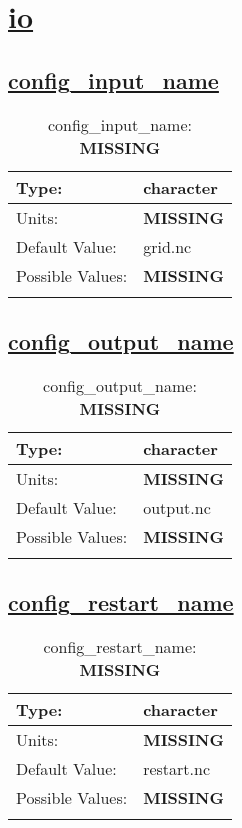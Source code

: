 \section[io]{\hyperref[sec:nm_tab_io]{io}}
\label{sec:nm_sec_io}
\subsection[config\_input\_name]{\hyperref[sec:nm_tab_io]{config\_input\_name}}
\label{subsec:nm_sec_config_input_name}
\begin{center}
\begin{longtable}{| p{2.0in} | p{4.0in} |}
    \hline
    Type: & character \\
    \hline
    Units: & {\bf \color{red} MISSING} \\
    \hline
    Default Value: & grid.nc \\
    \hline
    Possible Values: & {\bf \color{red} MISSING} \\
    \hline
    \caption{config\_input\_name: {\bf \color{red} MISSING}}
\end{longtable}
\end{center}
\subsection[config\_output\_name]{\hyperref[sec:nm_tab_io]{config\_output\_name}}
\label{subsec:nm_sec_config_output_name}
\begin{center}
\begin{longtable}{| p{2.0in} | p{4.0in} |}
    \hline
    Type: & character \\
    \hline
    Units: & {\bf \color{red} MISSING} \\
    \hline
    Default Value: & output.nc \\
    \hline
    Possible Values: & {\bf \color{red} MISSING} \\
    \hline
    \caption{config\_output\_name: {\bf \color{red} MISSING}}
\end{longtable}
\end{center}
\subsection[config\_restart\_name]{\hyperref[sec:nm_tab_io]{config\_restart\_name}}
\label{subsec:nm_sec_config_restart_name}
\begin{center}
\begin{longtable}{| p{2.0in} | p{4.0in} |}
    \hline
    Type: & character \\
    \hline
    Units: & {\bf \color{red} MISSING} \\
    \hline
    Default Value: & restart.nc \\
    \hline
    Possible Values: & {\bf \color{red} MISSING} \\
    \hline
    \caption{config\_restart\_name: {\bf \color{red} MISSING}}
\end{longtable}
\end{center}
